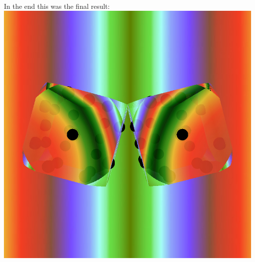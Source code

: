 \documentclass{article}
\begin{document}
\\In the end this was the final result: \\
\includegraphics[scale=0.22]{result.jpg}
\end{document}
